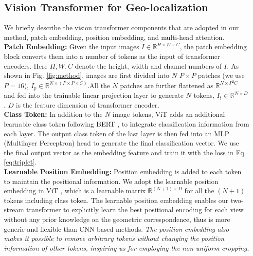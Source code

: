 \documentclass[10pt,twocolumn,letterpaper]{article}
\begin{document}
\subsection{Vision Transformer for Geo-localization} \label{sec:vit}
We briefly describe the vision transformer \cite{vit} components that are adopted in our method, \ie patch embedding, position embedding, and multi-head attention. \\\textbf{Patch Embedding:} Given the input images $I \in \mathbb{R}^{H\times W \times C}$, the patch embedding block converts them into a number of tokens as the input of transformer encoders. Here $H, W, C$ denote the height, width and channel numbers of $I$. As shown in Fig. \ref{fig:method}, images are first divided into $N$  $P\times P $ patches (we use $P=16$), $I_{p} \in \mathbb{R}^{N\times (P\times P \times C)}$.All the $N$ patches are further flattened as $\mathbb{R}^{N\times P^{2}C}$ and fed into the trainable linear projection layer to generate $N$ tokens, $I_{t} \in \mathbb{R}^{N\times D}$. $D$ is the feature dimension of transformer encoder.  \\
\textbf{Class Token:} In addition to the $N$ image tokens, ViT \cite{vit} adds an additional learnable class token following BERT \cite{devlin2018bert}, to integrate classification information from each layer. The output class token of the last layer is then fed into an MLP (Multilayer Perceptron) head to generate the final classification vector. We use the final output vector as the embedding feature and train it with the loss in Eq. \ref{eq:triplet}. \\
\textbf{Learnable Position Embedding:} Position embedding is added to each token   to maintain the positional information. We adopt the learnable position embedding in ViT \cite{vit}, which is a learnable matrix $\mathbb{R}^{(N+1)\times D}$ for all the $(N+1)$ tokens including class token. The learnable position embedding enables our two-stream transformer to explicitly learn the best positional encoding for each view without any prior knowledge on the geometric correspondence, thus is more generic and flexible than CNN-based methods. \textit{The position embedding also makes it possible to remove arbitrary tokens without changing the position information of other tokens, inspiring us for employing the non-uniform cropping.} \\
\end{document}
